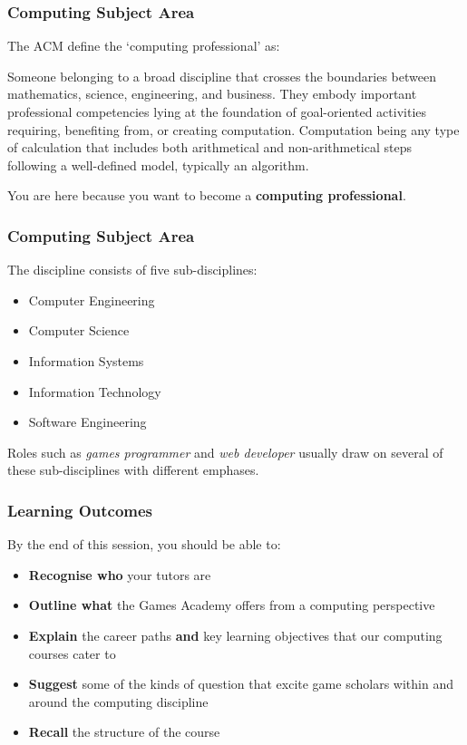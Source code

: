 \begin{frame}
	\frametitle{Computing Subject Area}
	
	The ACM define the `computing professional' as:
	
	\vspace{1em}
	
	Someone belonging to a broad discipline that crosses the boundaries between mathematics, science, engineering, and business. They embody important professional competencies lying at the foundation of goal-oriented activities requiring, benefiting from, or creating computation. Computation being any type of calculation that includes both arithmetical and non-arithmetical steps following a	well-defined model, typically an algorithm.
	
	\vspace{1em}
	
	You are here because you want to become a \textbf{computing professional}.

\end{frame}

\begin{frame}
	\frametitle{Computing Subject Area}
	
	The discipline consists of five sub-disciplines:
	
	\begin{itemize}
		\item Computer Engineering
		\item Computer Science
		\item Information Systems
		\item Information Technology
		\item Software Engineering	
	\end{itemize}

	Roles such as \textit{games programmer} and \textit{web developer} usually draw on several of these sub-disciplines with different emphases.

\end{frame}

\begin{frame}
	\frametitle{Learning Outcomes}
	
	By the end of this session, you should be able to:
	
	\begin{itemize}
		\item \textbf{Recognise who} your tutors are
		\item \textbf{Outline what} the Games Academy offers from a computing perspective
		\item \textbf{Explain} the career paths \textbf{and} key learning objectives that our computing courses cater to
		\item \textbf{Suggest} some of the kinds of question that excite game scholars within and around the computing discipline
		\item \textbf{Recall} the structure of the course
	\end{itemize}
\end{frame}

